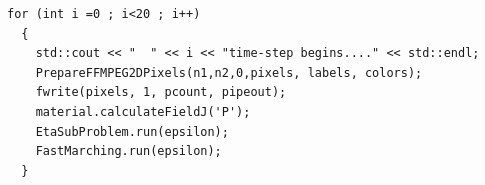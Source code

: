\documentclass[11pt]{article}
\begin{document}
\begin{tcolorbox}
\begin{lstlisting}[basicstyle=\footnotesize]
  for (int i =0 ; i<20 ; i++)
  {
    std::cout << "  " << i << "time-step begins...." << std::endl;
    PrepareFFMPEG2DPixels(n1,n2,0,pixels, labels, colors);
    fwrite(pixels, 1, pcount, pipeout);
    material.calculateFieldJ('P');
    EtaSubProblem.run(epsilon);
    FastMarching.run(epsilon);
  }
\end{lstlisting}
\end{tcolorbox}




\newpage

%      
%
%
% 
%
\end{document}
